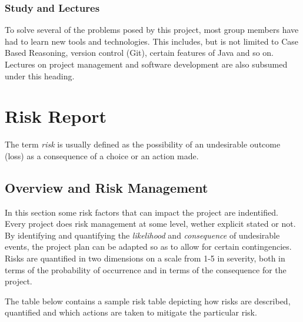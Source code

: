 \subsubsection{Study and Lectures}
To solve several of the problems posed by this project, most group members have had to learn new tools and technologies. This includes, but is not limited to Case Based Reasoning, version control (Git), certain features of Java and so on. Lectures on project management  and software development are also subsumed under this heading.

\section{Risk Report}\label{riskReport}
The term \emph{risk} is usually defined as the possibility of an undesirable outcome (loss) as a consequence of a choice or an action made. 


\subsection{Overview and Risk Management}
In this section some risk factors that can impact the project are indentified. Every project does risk management at some level, wether explicit stated or not. By identifying and quantifying the \emph{likelihood} and \emph{consequence} of undesirable events, the project plan can be adapted so as to allow for certain contingencies. Risks are quantified in two dimensions on a scale from 1-5 in severity, both in terms of the probability of occurrence and in terms of the consequence for the project.

The table below contains a sample risk table depicting how risks are described, quantified and which actions are taken to mitigate the particular risk. 


